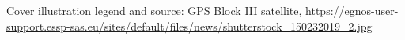 \thispagestyle{empty}
\vspace*{500pt} %
Cover illustration legend and source: GPS Block III satellite, \url{https://egnos-user-support.essp-sas.eu/sites/default/files/news/shutterstock_150232019_2.jpg}